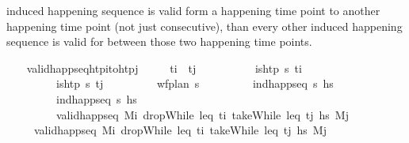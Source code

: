 \begin{isabellebody}
\begin{isamarkuptext}
  induced happening sequence is valid form a happening time point to another happening time 
  point (not just consecutive), than every other induced happening sequence is valid for 
  between those two happening time points.%
\end{isamarkuptext}\isamarkuptrue%
\ \ \isamarkupfalse%
\ valid{\isacharunderscore}{\kern0pt}happ{\isacharunderscore}{\kern0pt}seq{\isacharunderscore}{\kern0pt}htp{\isacharunderscore}{\kern0pt}i{\isacharunderscore}{\kern0pt}to{\isacharunderscore}{\kern0pt}htp{\isacharunderscore}{\kern0pt}j{\isacharcolon}{\kern0pt}\isanewline
\ \ \ \ \ {\isachardoublequoteopen}t\isactrlsub i\ {\isacharless}{\kern0pt}\ t\isactrlsub j{\isachardoublequoteclose}\ \isanewline
\ \ \ \ \ \ \ \ \ {\isachardoublequoteopen}is{\isacharunderscore}{\kern0pt}htp\ {\isasympi}s\ t\isactrlsub i{\isachardoublequoteclose}\ \isanewline
\ \ \ \ \ \ \ \ \ {\isachardoublequoteopen}is{\isacharunderscore}{\kern0pt}htp\ {\isasympi}s\ t\isactrlsub j{\isachardoublequoteclose}\isanewline
\ \ \ \ \ \ \ \ \ {\isachardoublequoteopen}wf{\isacharunderscore}{\kern0pt}plan\ {\isasympi}s{\isachardoublequoteclose}\isanewline
\ \ \ \ \ \ \ \ \ {\isachardoublequoteopen}ind{\isacharunderscore}{\kern0pt}happ{\isacharunderscore}{\kern0pt}seq\ {\isasympi}s\ hs\ \isanewline
\ \ \ \ \ \ \ \ \ {\isachardoublequoteopen}ind{\isacharunderscore}{\kern0pt}happ{\isacharunderscore}{\kern0pt}seq\ {\isasympi}s\ hs\ \isanewline
\ \ \ \ \ \ \ \ \ {\isachardoublequoteopen}valid{\isacharunderscore}{\kern0pt}happ{\isacharunderscore}{\kern0pt}seq\ M\isactrlsub i\ {\isacharparenleft}{\kern0pt}dropWhile\ {\isacharparenleft}{\kern0pt}leq\ t\isactrlsub i{\isacharparenright}{\kern0pt}\ {\isacharparenleft}{\kern0pt}takeWhile\ {\isacharparenleft}{\kern0pt}leq\ t\isactrlsub j{\isacharparenright}{\kern0pt}\ hs\ M\isactrlsub j{\isachardoublequoteclose}\isanewline
\ \ \ \ \ {\isachardoublequoteopen}valid{\isacharunderscore}{\kern0pt}happ{\isacharunderscore}{\kern0pt}seq\ M\isactrlsub i\ {\isacharparenleft}{\kern0pt}dropWhile\ {\isacharparenleft}{\kern0pt}leq\ t\isactrlsub i{\isacharparenright}{\kern0pt}\ {\isacharparenleft}{\kern0pt}takeWhile\ {\isacharparenleft}{\kern0pt}leq\ t\isactrlsub j{\isacharparenright}{\kern0pt}\ hs\ M\isactrlsub j{\isachardoublequoteclose}\isanewline

\end{isabellebody}
